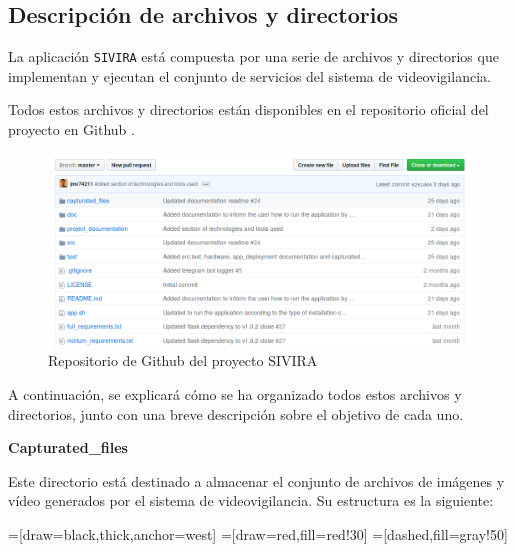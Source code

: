 \newpage

\subsection{Descripción de archivos y directorios}

La aplicación \texttt{SIVIRA} está compuesta por una serie de archivos y directorios que implementan y ejecutan el conjunto de servicios del sistema de videovigilancia.

Todos estos archivos y directorios están disponibles en el repositorio oficial del proyecto en Github \cite{ref1}.

\begin{figure}[h]
	\centering
	\includegraphics[scale=0.5]{images/43}
	\caption{Repositorio de Github del proyecto SIVIRA}
\end{figure}

A continuación, se explicará cómo se ha organizado todos estos archivos y directorios, junto con una breve descripción sobre el objetivo de cada uno.

\textbf{Capturated\_files}

Este directorio está destinado a almacenar el conjunto de archivos de imágenes y vídeo generados por el sistema de videovigilancia. Su estructura es la siguiente:

=[draw=black,thick,anchor=west]
=[draw=red,fill=red!30]
=[dashed,fill=gray!50]

